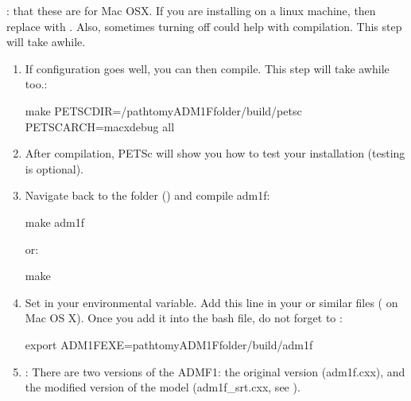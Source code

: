 \documentclass[a4paper,10pt,english]{sphinxmanual}
\begin{document}
\sphinxAtStartPar
{}: that these are for Mac OSX. If you are installing on a linux machine, then replace  with . Also, sometimes turning off  could help with compilation. This step will take awhile.
\begin{enumerate}
%
\setcounter{enumi}{3}
\item {} 
\sphinxAtStartPar
If configuration goes well, you can then compile. This step will take awhile too.:

\begin{sphinxVerbatim}[commandchars=\\\{\}]
\PYGZdl{} make PETSC\PYGZus{}DIR=/path\PYGZhy{}to\PYGZhy{}my\PYGZhy{}ADM1F\PYGZhy{}folder/build/petsc PETSC\PYGZus{}ARCH=macx\PYGZhy{}debug all
\end{sphinxVerbatim}

\item {} 
\sphinxAtStartPar
After compilation, PETSc will show you how to test your installation (testing is optional).

\item {} 
\sphinxAtStartPar
Navigate back to the  folder () and compile adm1f:

\begin{sphinxVerbatim}[commandchars=\\\{\}]
\PYGZdl{} make adm1f
\end{sphinxVerbatim}

\sphinxAtStartPar
or:

\begin{sphinxVerbatim}[commandchars=\\\{\}]
\PYGZdl{} make
\end{sphinxVerbatim}

\item {} 
\sphinxAtStartPar
Set  in your environmental variable. Add this line in your  or similar files ( on Mac OS X).  Once you add it into the bash file, do not forget to :

\begin{sphinxVerbatim}[commandchars=\\\{\}]
\PYGZdl{} export ADM1F\PYGZus{}EXE=path\PYGZhy{}to\PYGZhy{}my\PYGZhy{}ADM1F\PYGZhy{}folder/build/adm1f
\end{sphinxVerbatim}

\item {} 
\sphinxAtStartPar
{}: There are two versions of the ADMF1: the original version  (adm1f.cxx), and the modified version of the model (adm1f\_srt.cxx, see {\hyperref[\detokenize{compile:adm1f-srt}]{}}).

\end{enumerate}
\end{document}

